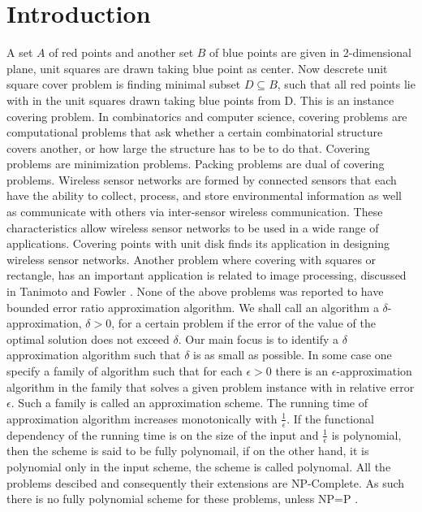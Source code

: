 \documentclass[10pt,a4wide]{report}
\theoremstyle{plain}
\theoremstyle{definition}
\theoremstyle{remark}
\begin{document}
\chapter {Introduction}
A set $A$ of red points and another set $B$ of blue points are given
in 2-dimensional plane, unit squares are drawn taking blue point as center. Now descrete unit
square cover problem is finding minimal subset $D \subseteq B$, such that all red points 
lie with in the unit squares drawn taking blue points from D. 
This is an instance covering problem. In combinatorics and computer science, covering problems are computational problems 
that ask whether a certain combinatorial structure covers another, or how large the structure 
has to be to do that. Covering problems are minimization problems. Packing problems are dual of 
covering problems. Wireless sensor networks are formed by connected sensors that each have the ability
to collect, process, and store environmental information as well as communicate with
others via inter-sensor wireless communication. These characteristics allow wireless
sensor networks to be used in a wide range of applications. Covering points with unit disk finds its application in 
designing wireless sensor networks. Another problem where covering with squares or rectangle, has an 
important application is related to image processing, discussed in Tanimoto and Fowler \cite{TF80}.
None of the above problems was reported to have bounded error ratio approximation algorithm. We
shall call an algorithm a $\delta$-approximation, $\delta >0$, for a certain problem if the error of the
value of the optimal solution does not exceed $\delta$. Our main focus is to identify a $\delta$ approximation
algorithm such that $\delta$ is as small as possible. In some case one specify a family of algorithm such that for each 
$\epsilon >0$ there is an $\epsilon$-approximation algorithm in the family that solves a given problem instance 
with in relative error $\epsilon$. Such a family is called an approximation scheme. The running time of approximation
algorithm increases monotonically with $\frac{1}{\epsilon}$. If the functional dependency of the running time is on the
size of the input and $\frac{1}{\epsilon}$ is polynomial, then the scheme is said to be fully polynomail, if 
on the other hand, it is polynomial only in the input scheme, the scheme is called polynomal.
All the problems descibed and consequently their extensions are NP-Complete. As such there is no fully
polynomial scheme for these problems, unless NP=P \cite{GMJD78}.
\end{document}
